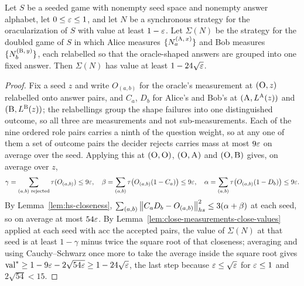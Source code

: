 \begin{lemma}
\label{lem:oracular-soundness}
\leanok
Let $S$ be a seeded game with nonempty seed space and nonempty answer alphabet, let
$0 \leq \varepsilon \leq 1$, and let $N$ be a synchronous strategy for the oracularization of $S$ with
value at least $1 - \varepsilon$. Let $\Sigma(N)$ be the strategy for the doubled game of $S$ in which
Alice measures $\{N^{(\textsc{A},\, x)}_a\}$ and Bob measures $\{N^{(\textsc{B},\, y)}_b\}$, each
relabelled so that the oracle-shaped answers are grouped into one fixed answer. Then
$\Sigma(N)$ has value at least $1 - 24\sqrt{\varepsilon}$.
\end{lemma}
\begin{proof}
\leanok
Fix a seed $z$ and write $O_{(a,b)}$ for the oracle's measurement at $(\textsc{O}, z)$ relabelled
onto answer pairs, and $C_a$, $D_b$ for Alice's and Bob's at $(\textsc{A}, L^{\textsc{A}}(z))$ and
$(\textsc{B}, L^{\textsc{B}}(z))$; the relabellings group the shape failures into one distinguished outcome,
so all three are measurements and not sub-measurements. Each of the nine ordered role pairs
carries a ninth of the question weight, so at any one of them a set of outcome pairs the
decider rejects carries mass at most $9\varepsilon$ on average over the seed. Applying this at
$(\textsc{O}, \textsc{O})$, $(\textsc{O}, \textsc{A})$ and $(\textsc{O}, \textsc{B})$ gives, on average over $z$,
\begin{equation*}
  \gamma = \sum_{(a,b) \text{ rejected}} \tau(O_{(a,b)}) \leq 9\varepsilon, \quad
  \beta = \sum_{(a,b)} \tau\bigl(O_{(a,b)}(1 - C_a)\bigr) \leq 9\varepsilon, \quad
  \alpha = \sum_{(a,b)} \tau\bigl(O_{(a,b)}(1 - D_b)\bigr) \leq 9\varepsilon.
\end{equation*}
By Lemma~\ref{lem:hs-closeness}, $\sum_{(a,b)} \left\| {C_aD_b - O_{(a,b)}} \right\|_{hs}^2 \leq
3(\alpha + \beta)$ at each seed, so on average at most $54\varepsilon$. By
Lemma~\ref{lem:close-measurements-close-values} applied at each seed with $\mathrm{acc}$ the
accepted pairs, the value of $\Sigma(N)$ at that seed is at least $1 - \gamma$ minus twice the
square root of that closeness; averaging and using Cauchy--Schwarz once more to take the
average inside the square root gives
$\mathrm{val}^* \geq 1 - 9\varepsilon - 2\sqrt{54\varepsilon} \geq 1 - 24\sqrt{\varepsilon}$, the last step because
$\varepsilon \leq \sqrt{\varepsilon}$ for $\varepsilon \leq 1$ and $2\sqrt{54} < 15$.
\end{proof}


